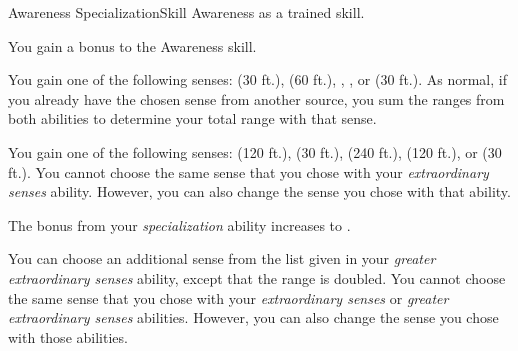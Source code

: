     \begin{feat}{Awareness Specialization}{Skill}
        \featpre Awareness as a trained skill.

         You gain a  bonus to the Awareness skill.

         You gain one of the following senses:  (30 ft.),  (60 ft.), , , or  (30 ft.).
        As normal, if you already have the chosen sense from another source, you sum the ranges from both abilities to determine your total range with that sense.

         You gain one of the following senses:  (120 ft.),  (30 ft.),  (240 ft.),  (120 ft.), or  (30 ft.).
        You cannot choose the same sense that you chose with your \textit{extraordinary senses} ability.
        However, you can also change the sense you chose with that ability.

         The bonus from your \textit{specialization} ability increases to .

         You can choose an additional sense from the list given in your \textit{greater extraordinary senses} ability, except that the range is doubled.
        You cannot choose the same sense that you chose with your \textit{extraordinary senses} or \textit{greater extraordinary senses} abilities.
        However, you can also change the sense you chose with those abilities.
    \end{feat}

